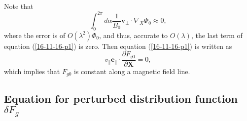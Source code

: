 \documentclass{article}
\begin{document}
Note that
\begin{equation}
  \int_0^{2 \pi} d \alpha \frac{1}{B_0} \mathbf{v}_{\perp} \cdot \nabla_X
  \Phi_0 \approx 0,
\end{equation}
where the error is of $O (\lambda^2) \Phi_0$, and thus, accurate to $O
(\lambda)$, the last term of equation (\ref{16-11-16-p1}) is zero. Then
equation (\ref{16-11-16-p1}) is written as
\begin{equation}
  v_{\parallel} \mathbf{e}_{\parallel} \cdot \frac{\partial F_{g 0}}{\partial
  \mathbf{X}} = 0,
\end{equation}
which implies that $F_{g 0}$ is constant along a magnetic field line.

\subsection{Equation for perturbed distribution function $\delta F_g$}
\end{document}
